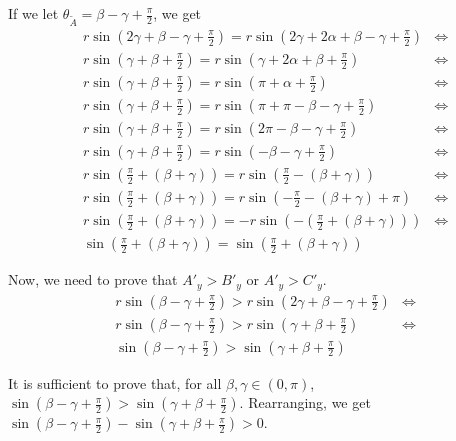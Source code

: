 \documentclass[a4paper,12pt]{article}
\newcommand{\HSview}[1][V]{\widetilde{#1}}
\theoremstyle{definition}
\theoremstyle{plain}
\begin{document}
	If we let $\theta_{\HSview[A]} = \beta - \gamma + \frac{\pi}{2}$, we get
	\begin{align*}
		& r\sin\left(2\gamma + \beta - \gamma + \frac{\pi}{2}\right) =
		  r\sin\left(2\gamma + 2\alpha + \beta - \gamma + \frac{\pi}{2}\right) & \iff \\
		& r\sin\left(\gamma + \beta + \frac{\pi}{2}\right) =
		  r\sin\left(\gamma + 2\alpha + \beta + \frac{\pi}{2}\right) & \iff \\
		& r\sin\left(\gamma + \beta + \frac{\pi}{2}\right) =
		  r\sin\left(\pi + \alpha + \frac{\pi}{2}\right) & \iff \\
		& r\sin\left(\gamma + \beta + \frac{\pi}{2}\right) =
		  r\sin\left(\pi + \pi - \beta - \gamma + \frac{\pi}{2}\right) & \iff \\
		& r\sin\left(\gamma + \beta + \frac{\pi}{2}\right) =
		  r\sin\left(2\pi - \beta - \gamma + \frac{\pi}{2}\right) & \iff \\
		& r\sin\left(\gamma + \beta + \frac{\pi}{2}\right) =
		  r\sin\left(- \beta - \gamma + \frac{\pi}{2}\right) & \iff \\
		& r\sin\left(\frac{\pi}{2} + \left(\beta + \gamma\right)\right) =
		  r\sin\left(\frac{\pi}{2} - \left(\beta + \gamma\right)\right) & \iff \\
		& r\sin\left(\frac{\pi}{2} + \left(\beta + \gamma\right)\right) =
		  r\sin\left(-\frac{\pi}{2} - \left(\beta + \gamma\right) + \pi\right) & \iff \\
		& r\sin\left(\frac{\pi}{2} + \left(\beta + \gamma\right)\right) =
		  -r\sin\left(-\left(\frac{\pi}{2} + \left(\beta + \gamma\right)\right)\right) & \iff \\
		& \sin\left(\frac{\pi}{2} + \left(\beta + \gamma\right)\right) =
		  \sin\left(\frac{\pi}{2} + \left(\beta + \gamma\right)\right)
	\end{align*}

	Now, we need to prove that $A'_y > B'_y$ or $A'_y > C'_y$.
	\begin{align*}
		& r\sin\left(\beta - \gamma + \frac{\pi}{2}\right) >
		  r\sin\left(2\gamma + \beta - \gamma + \frac{\pi}{2}\right) & \iff \\
		& r\sin\left(\beta - \gamma + \frac{\pi}{2}\right) >
		  r\sin\left(\gamma + \beta + \frac{\pi}{2}\right) & \iff \\
		& \sin\left(\beta - \gamma + \frac{\pi}{2}\right) >
		  \sin\left(\gamma + \beta + \frac{\pi}{2}\right)
	\end{align*}

	It is sufficient to prove that, for all $\beta, \gamma \in \left(0, \pi\right)$,
	$\sin\left(\beta - \gamma + \frac{\pi}{2}\right) >
	 \sin\left(\gamma + \beta + \frac{\pi}{2}\right)$. Rearranging, we get 
	$\sin\left(\beta - \gamma + \frac{\pi}{2}\right) -
	 \sin\left(\gamma + \beta + \frac{\pi}{2}\right) > 0$.
\end{document}
